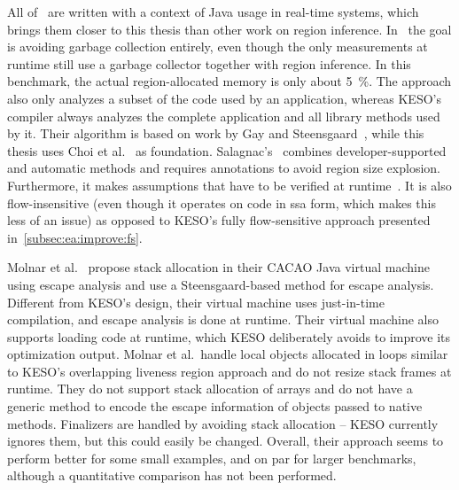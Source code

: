 	All of~\cite{chin:04:pldi, salagnac:05:aiool, salagnac:07:rtcsa} are written with a context of Java usage in real-time
	systems, which brings them closer to this thesis than other work on region inference. In~\cite{salagnac:05:aiool} the
	goal is avoiding garbage collection entirely, even though the only measurements at runtime still use a garbage
	collector together with region inference. In this benchmark, the actual region-allocated memory is only about 5~\%.
	The approach also only analyzes a subset of the code used by an application, whereas KESO's compiler always analyzes
	the complete application and all library methods used by it. Their algorithm is based on work by Gay and
	Steensgaard~\cite{gay:00:cc}, while this thesis uses Choi et al.~\cite{choi:03:toplas} as foundation.
	Salagnac's~\cite{salagnac:07:rtcsa} combines developer-supported and automatic methods and requires annotations to
	avoid region size explosion. Furthermore, it makes assumptions that have to be verified at
	runtime~\cite[Sec.~3.1]{salagnac:07:rtcsa}. It is also flow-insensitive (even though it operates on code in \gls{ssa}
	form, which makes this less of an issue) as opposed to KESO's fully flow-sensitive approach presented
	in~\cref{subsec:ea:improve:fs}.

	Molnar et al.~\cite{molnar:09:pppj} propose stack allocation in their CACAO Java virtual machine using escape analysis
	and use a Steensgaard-based method for escape analysis. Different from KESO's design, their virtual machine uses
	just-in-time compilation, and escape analysis is done at runtime. Their virtual machine also supports loading code at
	runtime, which KESO deliberately avoids to improve its optimization output. Molnar et al.\ handle local objects
	allocated in loops similar to KESO's overlapping liveness region approach and do not resize stack frames at runtime.
	They do not support stack allocation of arrays and do not have a generic method to encode the escape information of
	objects passed to native methods. Finalizers are handled by avoiding stack allocation – KESO currently ignores them,
	but this could easily be changed. Overall, their approach seems to perform better for some small examples, and on par
	for larger benchmarks, although a quantitative comparison has not been performed.
